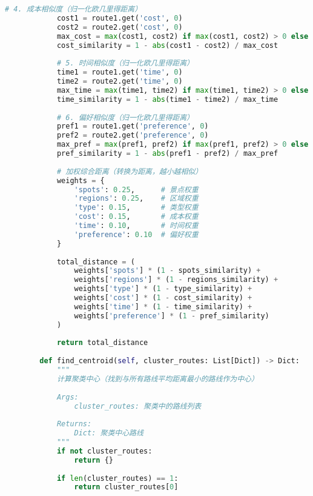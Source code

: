 \begin{lstlisting}[language=Python]
            # 4. 成本相似度（归一化欧几里得距离）
            cost1 = route1.get('cost', 0)
            cost2 = route2.get('cost', 0)
            max_cost = max(cost1, cost2) if max(cost1, cost2) > 0 else 1
            cost_similarity = 1 - abs(cost1 - cost2) / max_cost
            
            # 5. 时间相似度（归一化欧几里得距离）
            time1 = route1.get('time', 0)
            time2 = route2.get('time', 0)
            max_time = max(time1, time2) if max(time1, time2) > 0 else 1
            time_similarity = 1 - abs(time1 - time2) / max_time
            
            # 6. 偏好相似度（归一化欧几里得距离）
            pref1 = route1.get('preference', 0)
            pref2 = route2.get('preference', 0)
            max_pref = max(pref1, pref2) if max(pref1, pref2) > 0 else 1
            pref_similarity = 1 - abs(pref1 - pref2) / max_pref
            
            # 加权综合距离（转换为距离，越小越相似）
            weights = {
                'spots': 0.25,      # 景点权重
                'regions': 0.25,    # 区域权重
                'type': 0.15,       # 类型权重
                'cost': 0.15,       # 成本权重
                'time': 0.10,       # 时间权重
                'preference': 0.10  # 偏好权重
            }
            
            total_distance = (
                weights['spots'] * (1 - spots_similarity) +
                weights['regions'] * (1 - regions_similarity) +
                weights['type'] * (1 - type_similarity) +
                weights['cost'] * (1 - cost_similarity) +
                weights['time'] * (1 - time_similarity) +
                weights['preference'] * (1 - pref_similarity)
            )
            
            return total_distance
        
        def find_centroid(self, cluster_routes: List[Dict]) -> Dict:
            """
            计算聚类中心（找到与所有路线平均距离最小的路线作为中心）
            
            Args:
                cluster_routes: 聚类中的路线列表
                
            Returns:
                Dict: 聚类中心路线
            """
            if not cluster_routes:
                return {}
            
            if len(cluster_routes) == 1:
                return cluster_routes[0]
            

\end{lstlisting}

